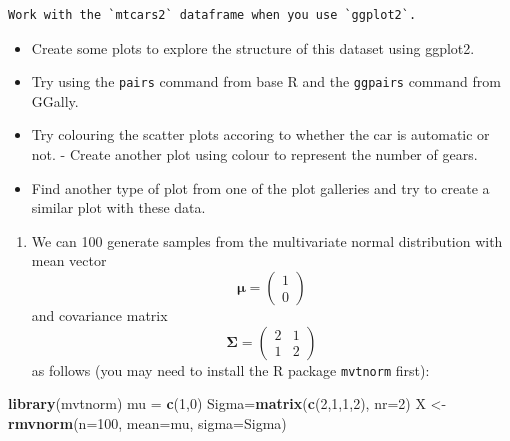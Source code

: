 \documentclass[]{book}
\newenvironment{Shaded}{\begin{snugshade}}{\end{snugshade}}
\newcommand{\DataTypeTok}[1]{\textcolor[rgb]{0.13,0.29,0.53}{#1}}
\newcommand{\DecValTok}[1]{\textcolor[rgb]{0.00,0.00,0.81}{#1}}
\newcommand{\KeywordTok}[1]{\textcolor[rgb]{0.13,0.29,0.53}{\textbf{#1}}}
\newcommand{\NormalTok}[1]{#1}
\newcommand{\StringTok}[1]{\textcolor[rgb]{0.31,0.60,0.02}{#1}}
\providecommand{\tightlist}{%
  \setlength{\itemsep}{0pt}\setlength{\parskip}{0pt}}
\theoremstyle{definition}
\theoremstyle{definition}
\theoremstyle{definition}
\theoremstyle{remark}
\begin{document}
\begin{verbatim}
Work with the `mtcars2` dataframe when you use `ggplot2`.
\end{verbatim}

\begin{itemize}
\tightlist
\item
  Create some plots to explore the structure of this dataset using ggplot2.
\item
  Try using the \texttt{pairs} command from base R and the \texttt{ggpairs} command from GGally.
\item
  Try colouring the scatter plots accoring to whether the car is automatic or not. - Create another plot using colour to represent the number of gears.
\item
  Find another type of plot from one of the plot galleries and try to create a similar plot with these data.
\end{itemize}

\begin{enumerate}
\def\labelenumi{\arabic{enumi}.}
\setcounter{enumi}{3}
\tightlist
\item
  We can 100 generate samples from the multivariate normal distribution with mean vector
  \[\boldsymbol \mu= \left(\begin{array}{c}1\\0\end{array}\right)\]
  and covariance matrix
  \[\boldsymbol \Sigma= \left(\begin{array}{cc}2&1\\1&2\end{array}\right)\]
  as follows (you may need to install the R package \texttt{mvtnorm} first):
\end{enumerate}

\begin{Shaded}
\begin{Highlighting}[]
\KeywordTok{library}\NormalTok{(mvtnorm)}
\NormalTok{mu =}\StringTok{ }\KeywordTok{c}\NormalTok{(}\DecValTok{1}\NormalTok{,}\DecValTok{0}\NormalTok{)}
\NormalTok{Sigma=}\KeywordTok{matrix}\NormalTok{(}\KeywordTok{c}\NormalTok{(}\DecValTok{2}\NormalTok{,}\DecValTok{1}\NormalTok{,}\DecValTok{1}\NormalTok{,}\DecValTok{2}\NormalTok{), }\DataTypeTok{nr=}\DecValTok{2}\NormalTok{)}
\NormalTok{X <-}\StringTok{ }\KeywordTok{rmvnorm}\NormalTok{(}\DataTypeTok{n=}\DecValTok{100}\NormalTok{, }\DataTypeTok{mean=}\NormalTok{mu, }\DataTypeTok{sigma=}\NormalTok{Sigma)}
\end{Highlighting}
\end{Shaded}
\end{document}
